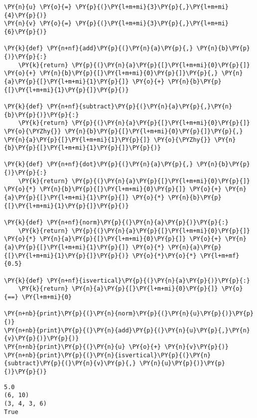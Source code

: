 \begin{Verbatim}[commandchars=\\\{\}]
\PY{n}{u} \PY{o}{=} \PY{p}{(}\PY{l+m+mi}{3}\PY{p}{,}\PY{l+m+mi}{4}\PY{p}{)}
\PY{n}{v} \PY{o}{=} \PY{p}{(}\PY{l+m+mi}{3}\PY{p}{,}\PY{l+m+mi}{6}\PY{p}{)}

\PY{k}{def} \PY{n+nf}{add}\PY{p}{(}\PY{n}{a}\PY{p}{,} \PY{n}{b}\PY{p}{)}\PY{p}{:}
    \PY{k}{return} \PY{p}{(}\PY{n}{a}\PY{p}{[}\PY{l+m+mi}{0}\PY{p}{]} \PY{o}{+} \PY{n}{b}\PY{p}{[}\PY{l+m+mi}{0}\PY{p}{]}\PY{p}{,} \PY{n}{a}\PY{p}{[}\PY{l+m+mi}{1}\PY{p}{]} \PY{o}{+} \PY{n}{b}\PY{p}{[}\PY{l+m+mi}{1}\PY{p}{]}\PY{p}{)}

\PY{k}{def} \PY{n+nf}{subtract}\PY{p}{(}\PY{n}{a}\PY{p}{,}\PY{n}{b}\PY{p}{)}\PY{p}{:}
    \PY{k}{return} \PY{p}{(}\PY{n}{a}\PY{p}{[}\PY{l+m+mi}{0}\PY{p}{]} \PY{o}{\PYZhy{}} \PY{n}{b}\PY{p}{[}\PY{l+m+mi}{0}\PY{p}{]}\PY{p}{,} \PY{n}{a}\PY{p}{[}\PY{l+m+mi}{1}\PY{p}{]} \PY{o}{\PYZhy{}} \PY{n}{b}\PY{p}{[}\PY{l+m+mi}{1}\PY{p}{]}\PY{p}{)}

\PY{k}{def} \PY{n+nf}{dot}\PY{p}{(}\PY{n}{a}\PY{p}{,} \PY{n}{b}\PY{p}{)}\PY{p}{:}
    \PY{k}{return} \PY{p}{(}\PY{n}{a}\PY{p}{[}\PY{l+m+mi}{0}\PY{p}{]} \PY{o}{*} \PY{n}{b}\PY{p}{[}\PY{l+m+mi}{0}\PY{p}{]} \PY{o}{+} \PY{n}{a}\PY{p}{[}\PY{l+m+mi}{1}\PY{p}{]} \PY{o}{*} \PY{n}{b}\PY{p}{[}\PY{l+m+mi}{1}\PY{p}{]}\PY{p}{)}

\PY{k}{def} \PY{n+nf}{norm}\PY{p}{(}\PY{n}{a}\PY{p}{)}\PY{p}{:}
    \PY{k}{return} \PY{p}{(}\PY{n}{a}\PY{p}{[}\PY{l+m+mi}{0}\PY{p}{]} \PY{o}{*} \PY{n}{a}\PY{p}{[}\PY{l+m+mi}{0}\PY{p}{]} \PY{o}{+} \PY{n}{a}\PY{p}{[}\PY{l+m+mi}{1}\PY{p}{]} \PY{o}{*} \PY{n}{a}\PY{p}{[}\PY{l+m+mi}{1}\PY{p}{]}\PY{p}{)} \PY{o}{*}\PY{o}{*} \PY{l+m+mf}{0.5}

\PY{k}{def} \PY{n+nf}{isvertical}\PY{p}{(}\PY{n}{a}\PY{p}{)}\PY{p}{:}
    \PY{k}{return} \PY{n}{a}\PY{p}{[}\PY{l+m+mi}{0}\PY{p}{]} \PY{o}{==} \PY{l+m+mi}{0}

\PY{n+nb}{print}\PY{p}{(}\PY{n}{norm}\PY{p}{(}\PY{n}{u}\PY{p}{)}\PY{p}{)}
\PY{n+nb}{print}\PY{p}{(}\PY{n}{add}\PY{p}{(}\PY{n}{u}\PY{p}{,}\PY{n}{v}\PY{p}{)}\PY{p}{)}
\PY{n+nb}{print}\PY{p}{(}\PY{n}{u} \PY{o}{+} \PY{n}{v}\PY{p}{)}
\PY{n+nb}{print}\PY{p}{(}\PY{n}{isvertical}\PY{p}{(}\PY{n}{subtract}\PY{p}{(}\PY{n}{v}\PY{p}{,} \PY{n}{u}\PY{p}{)}\PY{p}{)}\PY{p}{)}
\end{Verbatim}

\begin{Verbatim}
5.0
(6, 10)
(3, 4, 3, 6)
True

\end{Verbatim}


